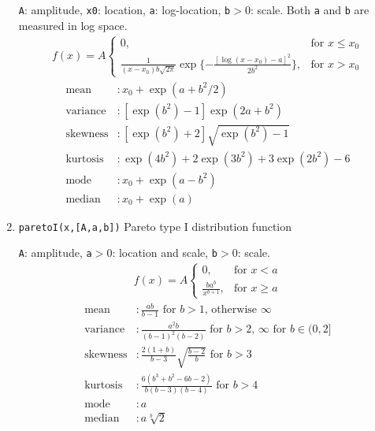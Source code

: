 \documentclass[reprint,showpacs,prb,nofootinbib,amsmath,amssymb]{revtex4-1}
\begin{document}
\begin{enumerate}
\verb|A|: amplitude, \verb|x0|: location, \verb|a|: log-location, \verb|b|$>0$: scale. Both \verb|a| and \verb|b| are measured in log space.
\begin{eqnarray}
f(x)=A
\begin{cases}
0, &\text{for }x\leq x_0 \\
\frac{1}{(x-x_0)b\sqrt{2\pi}}\exp\{-\frac{ \left[\log(x-x_0)-a\right]^2  }{2b^2}\}, &\text{for }x>x_0  \nonumber
\end{cases}
\end{eqnarray}
\begin{align}
	\mbox{mean} 		&: \mbox{$x_0+\exp(a+b^2/2)$} \nonumber \\
	\mbox{variance}		&: \mbox{$\left[\exp(b^2)-1\right]\exp(2a+b^2)$} \nonumber \\
	\mbox{skewness} 	&: \mbox{$\left[\exp(b^2)+2\right]\sqrt{\exp(b^2)-1}$} \nonumber \\	
	\mbox{kurtosis} 	&: \mbox{$\exp(4b^2)+2\exp(3b^2)+3\exp(2b^2)-6$} \nonumber \\	
	\mbox{mode}         &: \mbox{$x_0+\exp(a-b^2)$}  \nonumber \\
	\mbox{median} 		&: \mbox{$x_0+\exp(a)$}  \nonumber 
\end{align}

\item \verb|paretoI(x,[A,a,b])| Pareto type I distribution function~\cite{McLaughlin,paretoI}

\verb|A|: amplitude, \verb|a|$>0$: location and scale, \verb|b|$>0$: scale.
\begin{eqnarray}
f(x)=A
\begin{cases}
0, &\text{for }x< a \\
\frac{ba^b}{x^{b+1}}, &\text{for }x\geq a  \nonumber
\end{cases}
\end{eqnarray}
\begin{align}
	\mbox{mean} 		&: \mbox{$\frac{ab}{b-1}$ for $b>1$, otherwise $\infty$} \nonumber \\
	\mbox{variance}		&: \mbox{$\frac{a^2b}{(b-1)^2(b-2)}$ for $b>2$, $\infty$ for $b\in(0,2]$} \nonumber \\
	\mbox{skewness} 	&: \mbox{$\frac{2(1+b)}{b-3}\sqrt{\frac{b-2}{b}}$ for $b>3$} \nonumber \\	
	\mbox{kurtosis} 	&: \mbox{$\frac{6(b^3+b^2-6b-2)}{b(b-3)(b-4)}$ for $b>4$} \nonumber \\	
	\mbox{mode}         &: \mbox{$a$}  \nonumber \\
	\mbox{median} 		&: \mbox{$a\sqrt[b]{2}$}  \nonumber 
\end{align}


\end{enumerate}
\end{document}
